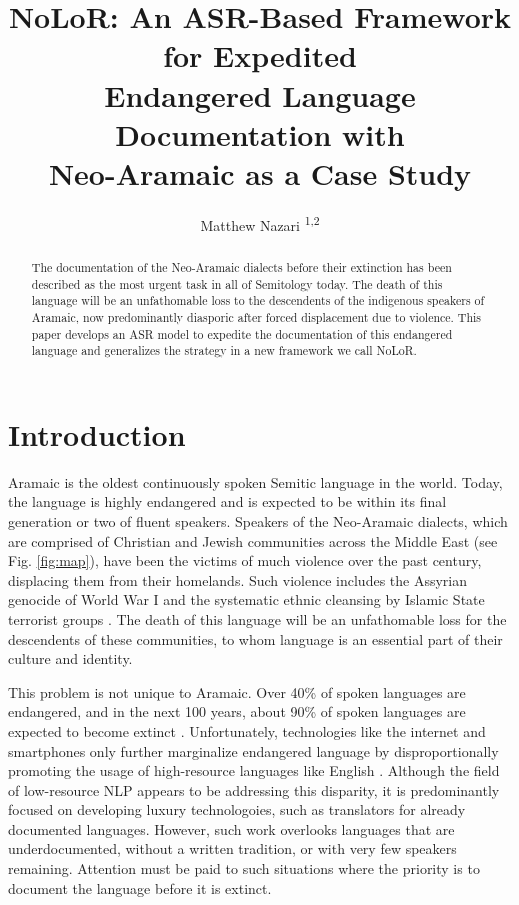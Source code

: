 \documentclass[letterpaper]{article} %
\title{NoLoR: An ASR-Based Framework for Expedited\\Endangered Language Documentation with\\Neo-Aramaic as a Case Study}
\author{
    Matthew Nazari \textsuperscript{\rm 1,\rm 2}
}
\begin{document}
\maketitle

\begin{abstract}
    The documentation of the Neo-Aramaic dialects before their extinction has been described as the most urgent task in all of Semitology today. The death of this language will be an unfathomable loss to the descendents of the indigenous speakers of Aramaic, now predominantly diasporic after forced displacement due to violence. This paper develops an ASR model to expedite the documentation of this endangered language and generalizes the strategy in a new framework we call NoLoR.
\end{abstract}


\section{Introduction}
Aramaic is the oldest continuously spoken Semitic language in the world. Today, the language is highly endangered and is expected to be within its final generation or two of fluent speakers. Speakers of the Neo-Aramaic dialects, which are comprised of Christian and Jewish communities across the Middle East (see Fig. \ref{fig:map}), have been the victims of much violence over the past century, displacing them from their homelands. Such violence includes the Assyrian genocide of World War I \cite{gaunt_2020} and the systematic ethnic cleansing by Islamic State terrorist groups \cite{uscirf}. The death of this language will be an unfathomable loss for the descendents of these communities, to whom language is an essential part of their culture and identity.

This problem is not unique to Aramaic. Over 40\% of spoken languages are endangered, and in the next 100 years, about 90\% of spoken languages are expected to become extinct \cite{moseley_nicolas_2010}. Unfortunately, technologies like the internet and smartphones only further marginalize endangered language by disproportionally promoting the usage of high-resource languages like English \cite{nllb}. Although the field of low-resource NLP appears to be addressing this disparity, it is predominantly focused on developing luxury technologoies, such as translators for already documented languages. However, such work overlooks languages that are underdocumented, without a written tradition, or with very few speakers remaining. Attention must be paid to such situations where the priority is to document the language before it is extinct.
\end{document}
